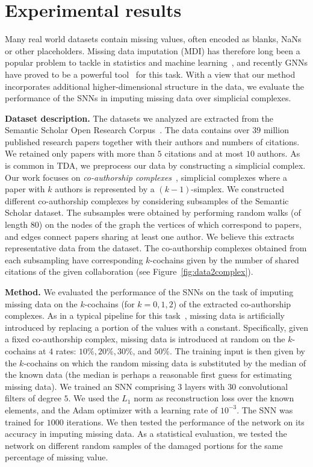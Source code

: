 \section{Experimental results}
Many real world datasets contain missing values, often encoded as blanks, NaNs or other placeholders. Missing data imputation (MDI) has therefore long been a popular problem to tackle in statistics and machine learning~\cite{little1986statistical, nelwamondo2007missing}, and recently GNNs have proved to be a powerful tool~\cite{spinelli2020neural} for this task. With a view that our method incorporates additional higher-dimensional structure in the data, we evaluate the performance of the SNNs in imputing missing data over simplicial complexes.

\textbf{Dataset description.} The datasets we analyzed are extracted from the Semantic Scholar Open Research Corpus~\cite{ammar18NAACL}. The data contains over $39$ million published research papers together with their authors and numbers of citations. We retained only papers with more than $5$ citations and at most $10$ authors. As is common in TDA, we preprocess our data by constructing a simplicial complex. Our work focuses on \emph{co-authorship complexes}~\cite{patania2017}, simplicial complexes where a paper with $k$ authors is represented by a $(k-1)$-simplex. We constructed different co-authorship complexes by considering subsamples of the Semantic Scholar dataset. The subsamples were obtained by performing random walks (of length $80$) on the nodes of the graph the vertices of which correspond to papers, and edges connect papers sharing at least one author. We believe this extracts representative data from the dataset. The co-authorship complexes obtained from each subsampling have corresponding $k$-cochains given by the number of shared citations of the given collaboration (see Figure~\ref{fig:data2complex}).

\textbf{Method.} We evaluated the performance of the SNNs on the task of imputing missing data on the $k$-cochains (for $k=0,1,2$) of the extracted co-authorship complexes. As in a typical pipeline for this task~\cite{nelwamondo2007missing}, missing data is artificially introduced by replacing a portion of the values with a constant. Specifically, given a fixed co-authorship complex, missing data is introduced at random on the $k$-cochains at $4$ rates: $10\%,  20\%,  30\%$, and $50\%$. The training input is then given by the $k$-cochains on which the random missing data is substituted by the median of the known data (the median is perhaps a reasonable first guess for estimating missing data). We trained an SNN comprising $3$ layers with $30$ convolutional filters of degree $5$. We used the $L_1$ norm as reconstruction loss over the known elements, and the Adam optimizer with a learning rate of $10^{-3}$. The SNN was trained for $1000$ iterations. We then tested the performance of the network on its accuracy in imputing missing data. As a statistical evaluation, we tested the network on different random samples of the damaged portions for the same percentage of missing value.

